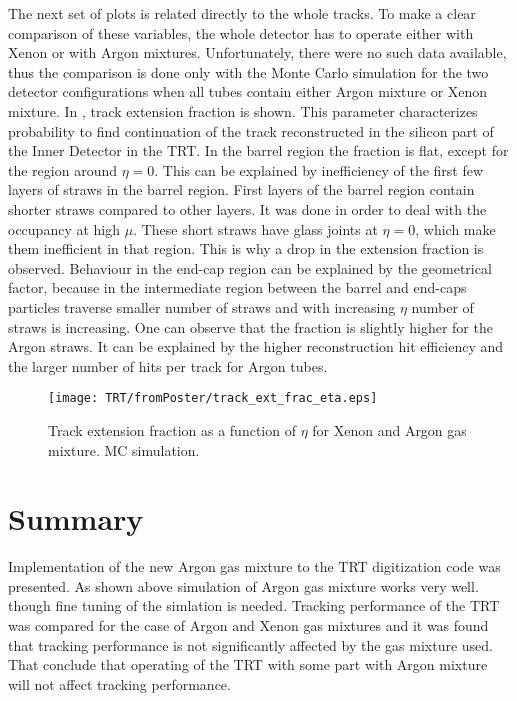 The next set of plots is related directly to the whole tracks. To make a clear comparison of these variables, the whole detector has to operate either with Xenon or with Argon mixtures.
Unfortunately, there were no such data available, thus the comparison is done only with the Monte Carlo simulation for the two detector configurations when 
all tubes contain either Argon mixture or Xenon mixture. In , track extension fraction is shown. This parameter characterizes
probability to find continuation of the track reconstructed in the silicon part of the Inner Detector in the TRT.
In the barrel region the fraction is flat, except for the region around $\eta = 0$. This can be explained by inefficiency of the first few layers of straws in the barrel region.
First layers of the barrel region contain shorter straws compared to other layers. It was done in order to deal with the occupancy at high $\mu$.
These short straws have glass joints at $\eta = 0$, which make them inefficient in that region. This is why a drop in the extension fraction is observed.
Behaviour in the end-cap region can be explained by the geometrical factor, because in the intermediate region between the barrel and end-caps particles
traverse smaller number of straws and with increasing $\eta$ number of straws is increasing.
One can observe that the fraction is slightly higher for the Argon straws. It can be explained by the higher reconstruction hit efficiency and the larger number of hits per
track for Argon tubes.

\begin{figure}
\begin{center}
 \texttt{[image: TRT/fromPoster/track\_ext\_frac\_eta.eps]}
\caption{Track extension fraction as a function of $\eta$ for Xenon and Argon gas mixture. MC simulation.}
\label{fig:track_ext_fraction}
\end{center}
\end{figure}

\section{Summary}
\label{sec:trt_summary}

Implementation of the new Argon gas mixture to the TRT digitization code was presented. As shown above simulation of Argon gas mixture works very well. though 
fine tuning of the simlation is needed.
Tracking performance of the TRT was compared for the case of Argon and Xenon gas mixtures and it was found that tracking performance is not significantly affected
by the gas mixture used. That conclude that operating of the TRT with some part with Argon mixture will not affect tracking performance.




